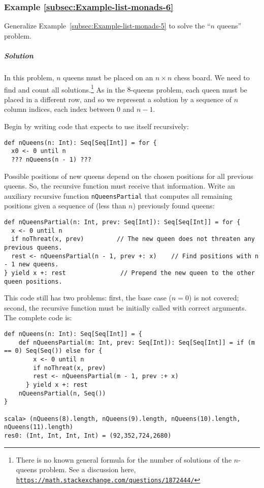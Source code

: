 \subsubsection{Example \label{subsec:Example-list-monads-6}\ref{subsec:Example-list-monads-6}}

Generalize Example~\ref{subsec:Example-list-monads-5} to solve the
\textsf{``}$n$ queens\textsf{''} problem.

\subparagraph{Solution}

In this problem, $n$ queens must be placed on an $n\times n$ chess
board. We need to find and count all solutions.\footnote{There is no known general formula for the number of solutions of the
$n$-queens problem. See a discussion here, \texttt{\href{https://math.stackexchange.com/questions/1872444/}{https://math.stackexchange.com/questions/1872444/}}} As in the $8$-queens problem, each queen must be placed in a different
row, and so we represent a solution by a sequence of $n$ column indices,
each index between $0$ and $n-1$.

Begin by writing code that expects to use itself recursively:
\begin{lstlisting}
def nQueens(n: Int): Seq[Seq[Int]] = for {
  x0 <- 0 until n
  ??? nQueens(n - 1) ???
\end{lstlisting}
Possible positions of new queens depend on the chosen positions for
all previous queens. So, the recursive function must receive that
information. Write an auxiliary recursive function \lstinline!nQueensPartial!
that computes all remaining positions given a sequence of (less than
$n$) previously found queens:
\begin{lstlisting}
def nQueensPartial(n: Int, prev: Seq[Int]): Seq[Seq[Int]] = for {
  x <- 0 until n
  if noThreat(x, prev)         // The new queen does not threaten any previous queens.
  rest <- nQueensPartial(n - 1, prev +: x)    // Find positions with n - 1 new queens.
} yield x +: rest               // Prepend the new queen to the other queen positions.
\end{lstlisting}

This code still has two problems: first, the base case ($n=0$) is
not covered; second, the recursive function must be initially called
with correct arguments. The complete code is:
\begin{lstlisting}
def nQueens(n: Int): Seq[Seq[Int]] = {
    def nQueensPartial(m: Int, prev: Seq[Int]): Seq[Seq[Int]] = if (m == 0) Seq(Seq()) else for {
        x <- 0 until n
        if noThreat(x, prev)
        rest <- nQueensPartial(m - 1, prev :+ x)
      } yield x +: rest
    nQueensPartial(n, Seq())
}

scala> (nQueens(8).length, nQueens(9).length, nQueens(10).length, nQueens(11).length)
res0: (Int, Int, Int, Int) = (92,352,724,2680)
\end{lstlisting}


